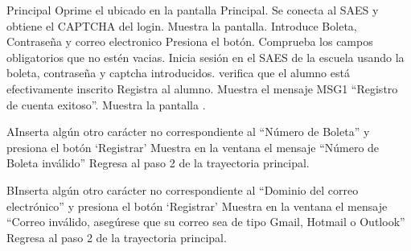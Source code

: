 \begin{UCtrayectoria}{Principal}
	\UCpaso[\UCactor] Oprime el  ubicado en la pantalla Principal.
	\UCpaso Se conecta al SAES y obtiene el CAPTCHA del login.
	\UCpaso Muestra la pantalla.
	\UCpaso[\UCactor] Introduce Boleta, Contraseña y correo electronico
	\UCpaso[\UCactor] Presiona el botón.
	\UCpaso Comprueba los campos obligatorios que no estén vacias.
	\UCpaso Inicia sesión en el SAES de la escuela usando la boleta, contraseña y captcha introducidos.
	\UCpaso verifica que el alumno está efectivamente inscrito  
	\UCpaso Registra al alumno.
	\UCpaso Muestra el mensaje MSG1 “Registro de cuenta exitoso”.
	\UCpaso Muestra la pantalla .
\end{UCtrayectoria}

\begin{UCtrayectoriaA}{A}{Inserta algún otro carácter no correspondiente al “Número de Boleta” y presiona el botón ‘Registrar’}
	\UCpaso Muestra en la ventana el mensaje “Número de Boleta inválido”
	\UCpaso Regresa al paso 2 de la trayectoria principal.
\end{UCtrayectoriaA}

\begin{UCtrayectoriaA}{B}{Inserta algún otro carácter no correspondiente al “Dominio del correo electrónico” y presiona el botón ‘Registrar’}
	\UCpaso Muestra en la ventana el mensaje “Correo inválido, asegúrese que su correo sea de tipo Gmail, Hotmail o Outlook”
	\UCpaso Regresa al paso 2 de la trayectoria principal.
\end{UCtrayectoriaA}
